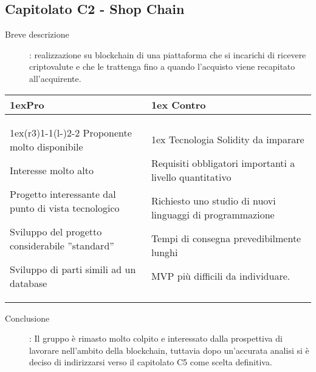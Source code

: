 \subsection{Capitolato C2 - Shop Chain}
\begin{description}
\item [Breve descrizione]: realizzazione su blockchain di una piattaforma che si incarichi di ricevere criptovalute e che le trattenga fino a quando l'acquisto viene recapitato all’acquirente.
\end{description}
\begin{table}[h]
\begin{tabularx}{\linewidth}{>{\parskip1ex}X@{\kern4\tabcolsep}>{\parskip1ex}X}
\hfil\bfseries Pro
&
\hfil\bfseries Contro
\\\cmidrule(r{3\tabcolsep}){1-1}\cmidrule(l{-\tabcolsep}){2-2}
Proponente molto disponibile \par
Interesse molto alto \par
Progetto interessante dal punto di vista tecnologico \par
Sviluppo del progetto considerabile ”standard” \par
Sviluppo di parti simili ad un database
&
Tecnologia Solidity da imparare \par 
Requisiti obbligatori importanti a livello quantitativo \par
Richiesto uno studio di nuovi linguaggi di programmazione \par
Tempi di consegna prevedibilmente lunghi \par
MVP più difficili da individuare. \\
\end{tabularx}
\end{table}
\begin{description}
	\item [Conclusione]: Il gruppo è rimasto molto colpito e interessato dalla prospettiva di lavorare nell'ambito della blockchain, tuttavia dopo un'accurata analisi si è deciso di indirizzarsi verso il capitolato C5 come scelta definitiva.
\end{description}


